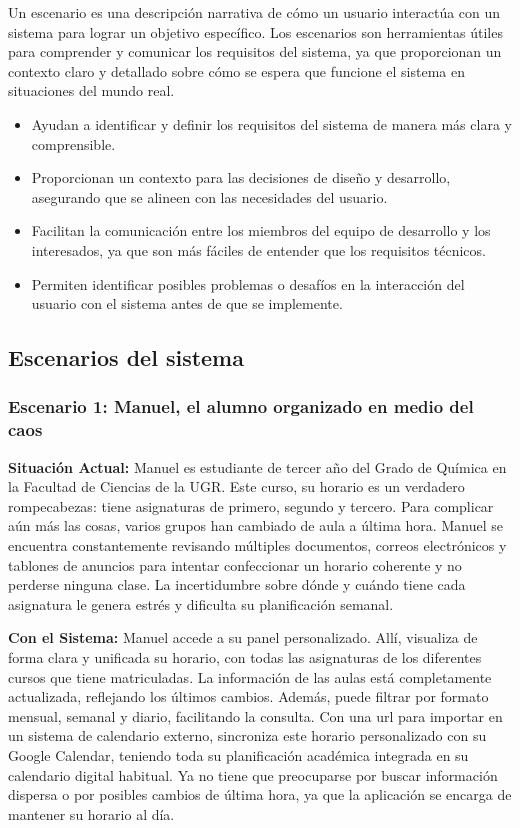 Un escenario es una descripción narrativa de cómo un usuario interactúa con un sistema para lograr un objetivo específico. Los escenarios son herramientas útiles para comprender y comunicar los requisitos del sistema, ya que proporcionan un contexto claro y detallado sobre cómo se espera que funcione el sistema en situaciones del mundo real.
\newline
{}
\begin{itemize}
    \item Ayudan a identificar y definir los requisitos del sistema de manera más clara y comprensible.
    \item Proporcionan un contexto para las decisiones de diseño y desarrollo, asegurando que se alineen con las necesidades del usuario.
    \item Facilitan la comunicación entre los miembros del equipo de desarrollo y los interesados, ya que son más fáciles de entender que los requisitos técnicos.
    \item Permiten identificar posibles problemas o desafíos en la interacción del usuario con el sistema antes de que se implemente.
\end{itemize}

\subsection{Escenarios del sistema}

\subsubsection*{Escenario 1: Manuel, el alumno organizado en medio del caos}

\textbf{Situación Actual:} Manuel es estudiante de tercer año del Grado de Química en la Facultad de Ciencias de la UGR. Este curso, su horario es un verdadero rompecabezas: tiene asignaturas de primero, segundo y tercero. Para complicar aún más las cosas, varios grupos han cambiado de aula a última hora. Manuel se encuentra constantemente revisando múltiples documentos, correos electrónicos y tablones de anuncios para intentar confeccionar un horario coherente y no perderse ninguna clase. La incertidumbre sobre dónde y cuándo tiene cada asignatura le genera estrés y dificulta su planificación semanal.

\textbf{Con el Sistema:} Manuel accede a su panel personalizado. Allí, visualiza de forma clara y unificada su horario, con todas las asignaturas de los diferentes cursos que tiene matriculadas. La información de las aulas está completamente actualizada, reflejando los últimos cambios. Además, puede filtrar por formato mensual, semanal y diario, facilitando la consulta. Con una url para importar en un sistema de calendario externo, sincroniza este horario personalizado con su Google Calendar, teniendo toda su planificación académica integrada en su calendario digital habitual. Ya no tiene que preocuparse por buscar información dispersa o por posibles cambios de última hora, ya que la aplicación se encarga de mantener su horario al día.


